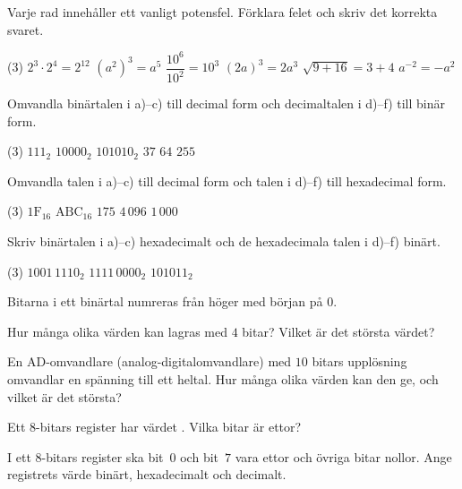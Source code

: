 Varje rad innehåller ett vanligt potensfel. Förklara felet och skriv det korrekta svaret.
\begin{delar}(3)
  \task $2^3 \cdot 2^4 = 2^{12}$
  \task $\left(a^2\right)^3 = a^5$
  \task $\dfrac{10^6}{10^2} = 10^3$
  \task $(2a)^3 = 2a^3$
  \task $\sqrt{9 + 16} = 3 + 4$
  \task $a^{-2} = -a^2$
\end{delar}

Omvandla binärtalen i a)--c) till decimal form och decimaltalen i d)--f) till binär form.
\begin{delar}(3)
  \task $111_2$
  \task $10000_2$
  \task $101010_2$
  \task $37$
  \task $64$
  \task $255$
\end{delar}

Omvandla talen i a)--c) till decimal form och talen i d)--f) till hexadecimal form.
\begin{delar}(3)
  \task $\mathrm{1F}_{16}$
  \task {}
  \task $\mathrm{ABC}_{16}$
  \task $175$
  \task $4\,096$
  \task $1\,000$
\end{delar}

Skriv binärtalen i a)--c) hexadecimalt och de hexadecimala talen i d)--f) binärt.
\begin{delar}(3)
  \task $1001\,1110_2$
  \task $1111\,0000_2$
  \task $101011_2$
  \task {}
  \task {}
  \task {}
\end{delar}

Bitarna i ett binärtal numreras från höger med början på $0$.
\begin{parts}
  \item Hur många olika värden kan lagras med $4$ bitar? Vilket är det största värdet?
  \item En AD-omvandlare (analog-digitalomvandlare) med $10$ bitars upplösning omvandlar en
    spänning till ett heltal. Hur många olika värden kan den ge, och vilket är det största?
  \item Ett 8-bitars register har värdet . Vilka bitar är ettor?
  \item I ett 8-bitars register ska bit~$0$ och bit~$7$ vara ettor och övriga bitar nollor. Ange
    registrets värde binärt, hexadecimalt och decimalt.
\end{parts}
